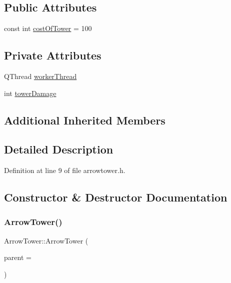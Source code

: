 \subsection*{Public Attributes}
\begin{DoxyCompactItemize}
\item 
const int \hyperlink{class_arrow_tower_a5205aca3c7be32a30266f6e059857d90}{cost\+Of\+Tower} = 100
\end{DoxyCompactItemize}
\subsection*{Private Attributes}
\begin{DoxyCompactItemize}
\item 
Q\+Thread \hyperlink{class_arrow_tower_a3264fff2b7ceb29032942c88e80e2a65}{worker\+Thread}
\item 
int \hyperlink{class_arrow_tower_a3623752851bb010bb650ca63ed9dd26c}{tower\+Damage}
\end{DoxyCompactItemize}
\subsection*{Additional Inherited Members}


\subsection{Detailed Description}


Definition at line 9 of file arrowtower.\+h.



\subsection{Constructor \& Destructor Documentation}
\mbox{\label{class_arrow_tower_a7b2c3a4465b810b204a46432266ba50e}} 
\subsubsection{\texorpdfstring{Arrow\+Tower()}{ArrowTower()}}
{\footnotesize\ttfamily Arrow\+Tower\+::\+Arrow\+Tower (\begin{DoxyParamCaption}\item[{Q\+Graphics\+Item $\ast$}]{parent = {} }\end{DoxyParamCaption})}




